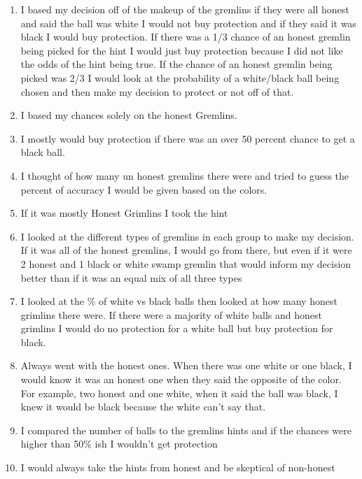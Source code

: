 \documentclass[12pt,a4paper]{article}
\begin{document}
\begin{appendices}
\begin{enumerate}
\item I based my decision off of the makeup of the gremlins if they were all honest and said the ball was white I would not buy protection and if they said it was black I would buy protection. If there was a 1/3 chance of an honest gremlin being picked for the hint I would just buy protection because I did not like the odds of the hint being true. If the chance of an honest gremlin being picked was 2/3 I would look at the probability of a white/black ball being chosen and then make my decision to protect or not off of that.

\item I based my chances solely on the honest Gremlins.

\item I mostly would buy protection if there was an over 50 percent chance to get a black ball.

\item I thought of how many un honest gremlins there were and tried to guess the percent of accuracy I would be given based on the colors.

\item If it was mostly Honest Grimlins I took the hint

\item I looked at the different types of gremlins in each group to make my decision. If it was all of the honest gremlins, I would go from there, but even if it were 2 honest and 1 black or white swamp gremlin that would inform my decision better than if it was an equal mix of all three types

\item I looked at the \% of white vs black balls then looked at how many honest grimlins there were. If there were a majority of white balls and honest grimlins I would do no protection for a white ball but buy protection for black.

\item Always went with the honest ones. When there was one white or one black, I would know it was an honest one when they said the opposite of the color. For example, two honest and one white, when it said the ball was black, I knew it would be black because the white can't say that.

\item I compared the number of balls to the gremlins hints and if the chances were higher than 50\% ish I wouldn't get protection

\item I would always take the hints from honest and be skeptical of non-honest


\end{enumerate}
\end{appendices}
\end{document}
